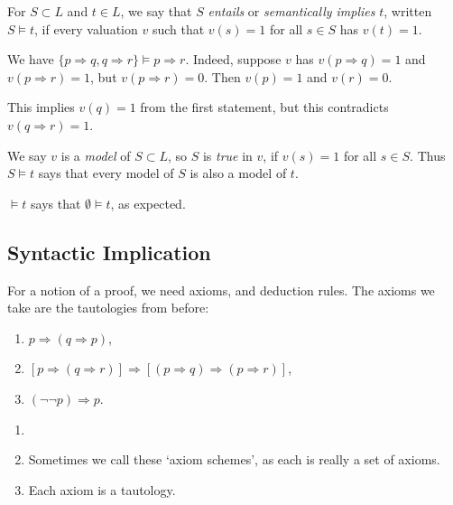 \documentclass[12pt]{article}
\begin{document}
For $S \subset L$ and $t \in L$, we say that $S$ \emph{entails} or \emph{semantically implies} $t$, written $S \models t$, if every valuation $v$ such that $v(s) = 1$ for all $s \in S$ has $v(t) = 1$.

\begin{exbox}
	We have $\{p \Rightarrow q, q \Rightarrow r\} \models p \Rightarrow r$. Indeed, suppose $v$ has $v(p \Rightarrow q) = 1$ and $v(p \Rightarrow r) = 1$, but $v(p \Rightarrow r) = 0$. Then $v(p) = 1$ and $v(r) = 0$.

	This implies $v(q) = 1$ from the first statement, but this contradicts $v(q \Rightarrow r) = 1$.
\end{exbox}

We say $v$ is a \emph{model} of $S \subset L$, so $S$ is \emph{true} in $v$, if $v(s) = 1$ for all $s \in S$. Thus $S \models t$ says that every model of $S$ is also a model of $t$.

\begin{remark}
	$\models t$ says that $\emptyset \models t$, as expected.
\end{remark}

\subsection{Syntactic Implication}
\label{sub:syntactic_implication}

For a notion of a proof, we need axioms, and deduction rules. The axioms we take are the tautologies from before:
\begin{enumerate}
	\item $p \Rightarrow (q \Rightarrow p)$,
	\item $[p \Rightarrow (q \Rightarrow r)] \Rightarrow [(p \Rightarrow q) \Rightarrow (p \Rightarrow r)]$,
	\item $(\neg \neg p) \Rightarrow p$.
\end{enumerate}

\begin{remark}
	\begin{enumerate}[1.]
		\item[]
		\item Sometimes we call these `axiom schemes', as each is really a set of axioms.
		\item Each axiom is a tautology.
	\end{enumerate}
\end{remark}
\end{document}
